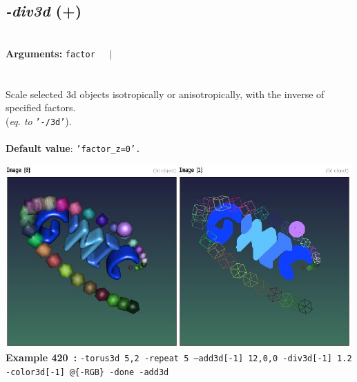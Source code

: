 \documentclass[a4paper,11pt,twoside]{book}
\begin{document}
\subsection{\emph{-div3d} (+)}\vspace*{-0.5em}
~\\\textbf{Arguments: } 
{\small \texttt{factor}}~~~$|$\\
\\~\\
Scale selected 3d objects isotropically or anisotropically, with the inverse of specified
factors.
~\\(\emph{eq. to} {\small \texttt{'-/3d'}}).
~\\~\\\textbf{Default value}: {\small \texttt{'factor\_z=0'.}}
\begin{center}\includegraphics[keepaspectratio=true,height=7cm,width=\textwidth]{img/gmic_def420.jpg}\\
{\footnotesize \textbf{Example 420~:} \texttt{-torus3d 5,2 -repeat 5 --add3d[-1] 12,0,0 -div3d[-1] 1.2 -color3d[-1] @\{-RGB\} -done -add3d}}
\end{center}
\end{document}
